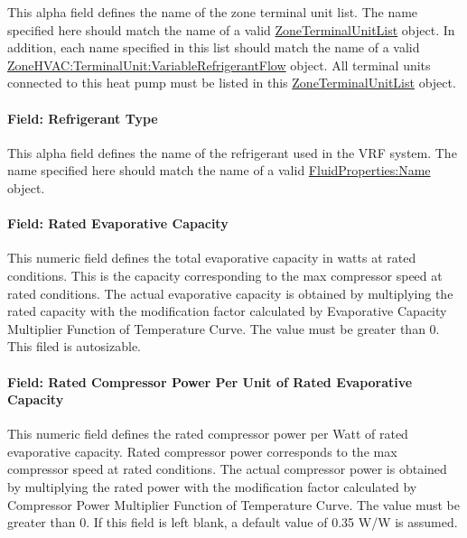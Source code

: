 This alpha field defines the name of the zone terminal unit list. The name specified here should match the name of a valid \hyperref[zoneterminalunitlist]{ZoneTerminalUnitList} object. In addition, each name specified in this list should match the name of a valid \hyperref[zonehvacterminalunitvariablerefrigerantflow]{ZoneHVAC:TerminalUnit:VariableRefrigerantFlow} object. All terminal units connected to this heat pump must be listed in this \hyperref[zoneterminalunitlist]{ZoneTerminalUnitList} object.

\paragraph{Field: Refrigerant Type}\label{field-refrigerant-type-000}

This alpha field defines the name of the refrigerant used in the VRF system. The name specified here should match the name of a valid \hyperref[fluidpropertiesname]{FluidProperties:Name} object.

\paragraph{Field: Rated Evaporative Capacity}\label{field-rated-evaporative-capacity}

This numeric field defines the total evaporative capacity in watts at rated conditions. This is the capacity corresponding to the max compressor speed at rated conditions. The actual evaporative capacity is obtained by multiplying the rated capacity with the modification factor calculated by Evaporative Capacity Multiplier Function of Temperature Curve. The value must be greater than 0. This filed is autosizable.

\paragraph{Field: Rated Compressor Power Per Unit of Rated Evaporative Capacity}\label{field-rated-compressor-power-per-unit-of-rated-evaporative-capacity}

This numeric field defines the rated compressor power per Watt of rated evaporative capacity. Rated compressor power corresponds to the max compressor speed at rated conditions. The actual compressor power is obtained by multiplying the rated power with the modification factor calculated by Compressor Power Multiplier Function of Temperature Curve. The value must be greater than 0. If this field is left blank, a default value of 0.35 W/W is assumed.

